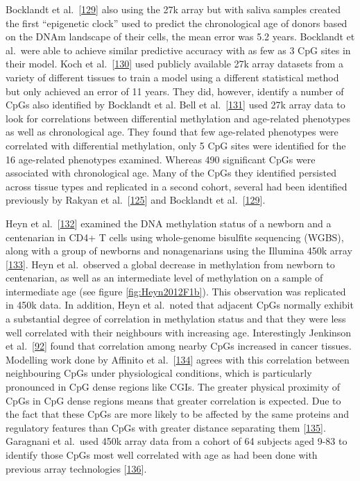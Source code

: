 \documentclass[
]{book}
\begin{document}
Bocklandt et al.~{[}\protect\hyperlink{ref-Bocklandt2011}{129}{]} also using the 27k array but with saliva samples created the first ``epigenetic clock'' used to predict the chronological age of donors based on the DNAm landscape of their cells, the mean error was 5.2 years.
Bocklandt et al.~were able to achieve similar predictive accuracy with as few as 3 CpG sites in their model.
Koch et al.~{[}\protect\hyperlink{ref-Koch2011}{130}{]} used publicly available 27k array datasets from a variety of different tissues to train a model using a different statistical method but only achieved an error of 11 years.
They did, however, identify a number of CpGs also identified by Bocklandt et al.
Bell et al.~{[}\protect\hyperlink{ref-Bell2012}{131}{]} used 27k array data to look for correlations between differential methylation and age-related phenotypes as well as chronological age.
They found that few age-related phenotypes were correlated with differential methylation, only 5 CpG sites were identified for the 16 age-related phenotypes examined. Whereas 490 significant CpGs were associated with chronological age.
Many of the CpGs they identified persisted across tissue types and replicated in a second cohort, several had been identified previously by Rakyan et al.~{[}\protect\hyperlink{ref-Rakyan2010}{125}{]} and Bocklandt et al.~{[}\protect\hyperlink{ref-Bocklandt2011}{129}{]}.

Heyn et al.~{[}\protect\hyperlink{ref-Heyn2012}{132}{]} examined the DNA methylation status of a newborn and a centenarian in CD4+ T cells using whole-genome bisulfite sequencing (WGBS), along with a group of newborns and nonagenarians using the Illumina 450k array {[}\protect\hyperlink{ref-Bibikova2011}{133}{]}.
Heyn et al.~observed a global decrease in methylation from newborn to centenarian, as well as an intermediate level of methylation on a sample of intermediate age (see figure \ref{fig:Heyn2012F1b}).
This observation was replicated in 450k data.
In addition, Heyn et al.~noted that adjacent CpGs normally exhibit a substantial degree of correlation in methylation status and that they were less well correlated with their neighbours with increasing age.
Interestingly Jenkinson et al.~{[}\protect\hyperlink{ref-Jenkinson2017}{92}{]} found that correlation among nearby CpGs increased in cancer tissues.
Modelling work done by Affinito et al.~{[}\protect\hyperlink{ref-Affinito2016}{134}{]} agrees with this correlation between neighbouring CpGs under physiological conditions, which is particularly pronounced in CpG dense regions like CGIs.
The greater physical proximity of CpGs in CpG dense regions means that greater correlation is expected.
Due to the fact that these CpGs are more likely to be affected by the same proteins and regulatory features than CpGs with greater distance separating them {[}\protect\hyperlink{ref-Haerter2014}{135}{]}.
Garagnani et al.~used 450k array data from a cohort of 64 subjects aged 9-83 to identify those CpGs most well correlated with age as had been done with previous array technologies {[}\protect\hyperlink{ref-Garagnani2012}{136}{]}.
\end{document}
